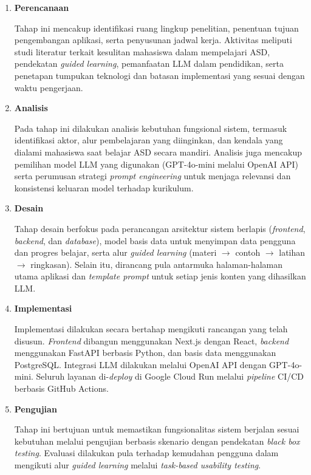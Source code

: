 \begin{enumerate}
    \item \textbf{Perencanaan}

    Tahap ini mencakup identifikasi ruang lingkup penelitian, penentuan tujuan pengembangan aplikasi, serta penyusunan jadwal kerja. Aktivitas meliputi studi literatur terkait kesulitan mahasiswa dalam mempelajari ASD, pendekatan \textit{guided learning}, pemanfaatan LLM dalam pendidikan, serta penetapan tumpukan teknologi dan batasan implementasi yang sesuai dengan waktu pengerjaan.

    \item \textbf{Analisis}

    Pada tahap ini dilakukan analisis kebutuhan fungsional sistem, termasuk identifikasi aktor, alur pembelajaran yang diinginkan, dan kendala yang dialami mahasiswa saat belajar ASD secara mandiri. Analisis juga mencakup pemilihan model LLM yang digunakan (GPT-4o-mini melalui OpenAI API) serta perumusan strategi \textit{prompt engineering} untuk menjaga relevansi dan konsistensi keluaran model terhadap kurikulum.

    \item \textbf{Desain}

    Tahap desain berfokus pada perancangan arsitektur sistem berlapis (\textit{frontend}, \textit{backend}, dan \textit{database}), model basis data untuk menyimpan data pengguna dan progres belajar, serta alur \textit{guided learning} (materi $\rightarrow$ contoh $\rightarrow$ latihan $\rightarrow$ ringkasan). Selain itu, dirancang pula antarmuka halaman-halaman utama aplikasi dan \textit{template prompt} untuk setiap jenis konten yang dihasilkan LLM.

    \item \textbf{Implementasi}

    Implementasi dilakukan secara bertahap mengikuti rancangan yang telah disusun. \textit{Frontend} dibangun menggunakan Next.js dengan React, \textit{backend} menggunakan FastAPI berbasis Python, dan basis data menggunakan PostgreSQL. Integrasi LLM dilakukan melalui OpenAI API dengan GPT-4o-mini. Seluruh layanan di-\textit{deploy} di Google Cloud Run melalui \textit{pipeline} CI/CD berbasis GitHub Actions.

    \item \textbf{Pengujian}

    Tahap ini bertujuan untuk memastikan fungsionalitas sistem berjalan sesuai kebutuhan melalui pengujian berbasis skenario dengan pendekatan \textit{black box testing}. Evaluasi dilakukan pula terhadap kemudahan pengguna dalam mengikuti alur \textit{guided learning} melalui \textit{task-based usability testing}.
\end{enumerate}

